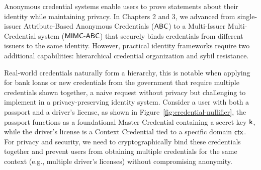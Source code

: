 Anonymous credential systems enable users to prove statements about their identity while maintaining privacy. In Chapters 2 and 3, we advanced from single-issuer Attribute-Based Anonymous Credentials ($\mathsf{ABC}$) to a Multi-Issuer Multi-Credential system ($\mathsf{MIMC\text{-}ABC}$) that securely binds credentials from different issuers to the same identity. However, practical identity frameworks require two additional capabilities: hierarchical credential organization and sybil resistance.

Real-world credentials naturally form a hierarchy, this is notable when applying for bank loans or new credentials from the government that require multiple credentials shown together, a naive request without privacy but challenging to implement in a privacy-preserving identity system. Consider a user with both a passport and a driver's license, as shown in Figure~\ref{fig:credential-nullifier}, the passport functions as a foundational Master Credential containing a secret key $\mathsf{k}$, while the driver's license is a Context Credential tied to a specific domain $\mathsf{ctx}$. For privacy and security, we need to cryptographically bind these credentials together and prevent users from obtaining multiple credentials for the same context (e.g., multiple driver's licenses) without compromising anonymity.

